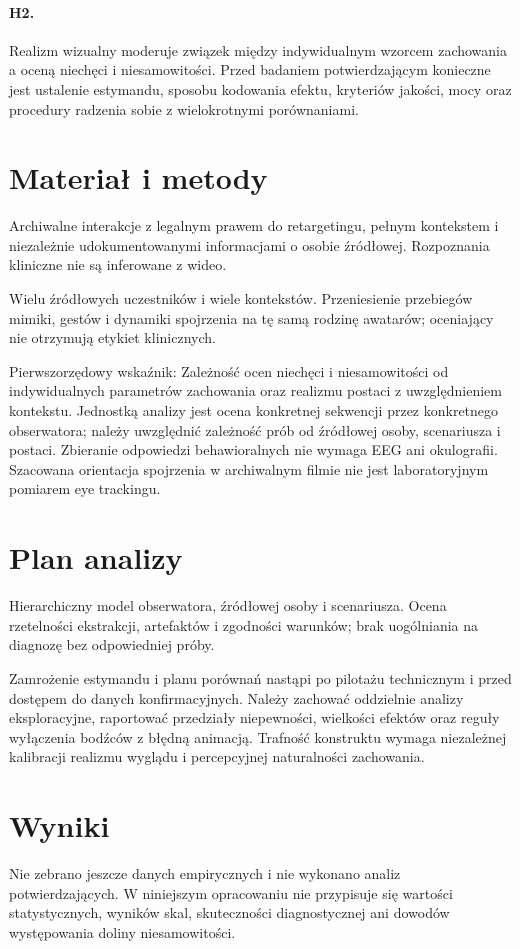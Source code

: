 \documentclass[11pt,a4paper]{article}
\begin{document}
\paragraph{H2.} Realizm wizualny moderuje związek między indywidualnym wzorcem zachowania a oceną niechęci i niesamowitości.
Przed badaniem potwierdzającym konieczne jest ustalenie estymandu, sposobu kodowania efektu, kryteriów jakości, mocy oraz procedury radzenia sobie z wielokrotnymi porównaniami.
\section{Materiał i metody}
Archiwalne interakcje z legalnym prawem do retargetingu, pełnym kontekstem i niezależnie udokumentowanymi informacjami o osobie źródłowej. Rozpoznania kliniczne nie są inferowane z wideo.

Wielu źródłowych uczestników i wiele kontekstów. Przeniesienie przebiegów mimiki, gestów i dynamiki spojrzenia na tę samą rodzinę awatarów; oceniający nie otrzymują etykiet klinicznych.

Pierwszorzędowy wskaźnik: Zależność ocen niechęci i niesamowitości od indywidualnych parametrów zachowania oraz realizmu postaci z uwzględnieniem kontekstu. Jednostką analizy jest ocena konkretnej sekwencji przez konkretnego obserwatora; należy uwzględnić zależność prób od źródłowej osoby, scenariusza i postaci. Zbieranie odpowiedzi behawioralnych nie wymaga EEG ani okulografii. Szacowana orientacja spojrzenia w archiwalnym filmie nie jest laboratoryjnym pomiarem eye trackingu.
\section{Plan analizy}
Hierarchiczny model obserwatora, źródłowej osoby i scenariusza. Ocena rzetelności ekstrakcji, artefaktów i zgodności warunków; brak uogólniania na diagnozę bez odpowiedniej próby.

Zamrożenie estymandu i planu porównań nastąpi po pilotażu technicznym i przed dostępem do danych konfirmacyjnych. Należy zachować oddzielnie analizy eksploracyjne, raportować przedziały niepewności, wielkości efektów oraz reguły wyłączenia bodźców z błędną animacją. Trafność konstruktu wymaga niezależnej kalibracji realizmu wyglądu i percepcyjnej naturalności zachowania.
\section{Wyniki}
Nie zebrano jeszcze danych empirycznych i nie wykonano analiz potwierdzających. W niniejszym opracowaniu nie przypisuje się wartości statystycznych, wyników skal, skuteczności diagnostycznej ani dowodów występowania doliny niesamowitości.
\end{document}
